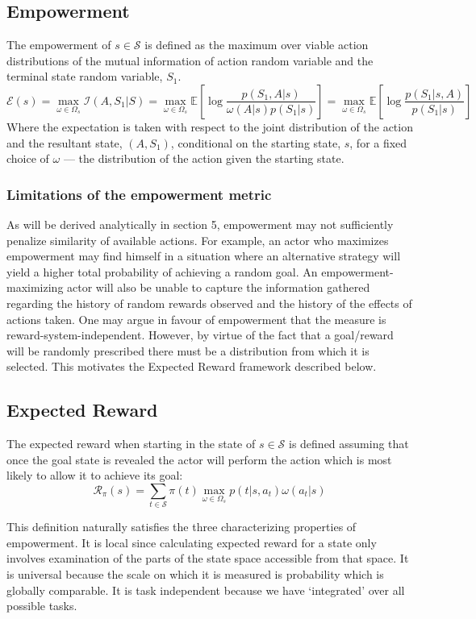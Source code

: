 \documentclass{article}
\newcommand{\EE}{\mathbb{E}}
\newcommand{\Ss}{\mathcal{S}}
\newcommand{\Ii}{\mathcal{I}}
\newcommand{\Ee}{\mathcal{E}}
\newcommand{\Rr}{\mathcal{R}}
\begin{document}
\subsection{Empowerment}
The empowerment of $s\in\mathcal{S}$ is defined as the maximum over viable action distributions of the mutual information of action random variable and the terminal state random variable, $S_1$.
\[\Ee(s)=\max_{\omega\in\Omega_s}\Ii(A,S_1|S)=\max_{\omega\in\Omega_s}\EE\left[\log\frac{p(S_1,A|s)}{\omega(A|s)p(S_1|s)}\right]=\max_{\omega\in\Omega_s}\EE\left[\log\frac{p(S_1|s,A)}{p(S_1|s)}\right] \]
Where the expectation is taken with respect to the joint distribution of the action and the resultant state, $(A,S_1)$, conditional on the starting state, $s$, for a fixed choice of $\omega$ --- the distribution of the action given the starting state. 
\subsubsection{Limitations of the empowerment metric}
As will be derived analytically in section 5, empowerment may not sufficiently penalize similarity of available actions.
For example, an actor who maximizes empowerment may find himself in a situation where an alternative strategy will yield a higher total probability of achieving a random goal.
An empowerment-maximizing actor will also be unable to capture the information gathered regarding the history of random rewards observed and the history of the effects of actions taken.
One may argue in favour of empowerment that the measure is reward-system-independent.
However, by virtue of the fact that a goal/reward will be randomly prescribed there must be a distribution from which it is selected. This motivates the Expected Reward framework described below.

\subsection{Expected Reward}
The expected reward when starting in the state of $s\in\mathcal{S}$ is defined assuming that once the goal state is revealed the actor will perform the action which is most likely to allow it to achieve its goal:
\[\Rr_\pi(s) = \sum_{t\in\Ss} \pi(t) \max_{\omega\in\Omega_s} p(t|s,a_t)\omega(a_t|s)\]

This definition naturally satisfies the three characterizing properties of empowerment. It is local since calculating expected reward for a state only involves examination of the parts of the state space accessible from that space. It is universal because the scale on which it is measured is probability which is globally comparable. It is task independent because we have `integrated' over all possible tasks.
\end{document}

